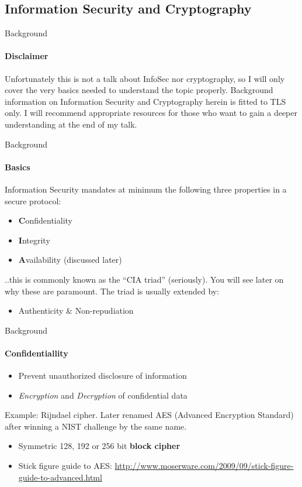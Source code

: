 \documentclass[hyperref={draft}]{beamer}
\begin{document}
\subsection{Information Security and Cryptography}

\begin{frame}{Background}
  \framesubtitle{Disclaimer}
  Unfortunately this is not a talk about InfoSec nor cryptography, so I will only cover the very basics needed to understand the topic properly. Background information on Information Security and Cryptography herein is fitted to TLS only.
  \newline
  \newline
  I will recommend appropriate resources for those who want to gain a deeper understanding at the end of my talk.
\end{frame}

\begin{frame}{Background}
  \framesubtitle{Basics}
  Information Security mandates at minimum the following three properties in a secure protocol:
  \begin{itemize}
    \item \textbf{C}onfidentiality
    \item \textbf{I}ntegrity
    \item \textbf{A}vailability (discussed later)
  \end{itemize}
  ..this is commonly known as the ``CIA triad'' (seriously). You will see later on why these are paramount. The triad is usually extended by:
  \begin{itemize}
    \item Authenticity \& Non-repudiation
  \end{itemize}
\end{frame}

\begin{frame}{Background}
  \framesubtitle{Confidentiallity}
  \begin{itemize}
    \item Prevent unauthorized disclosure of information
    \item \emph{Encryption} and \emph{Decryption} of confidential data
  \end{itemize}
  Example: Rijndael cipher. Later renamed AES (Advanced Encryption Standard) after winning a NIST challenge by the same name.
  \begin{itemize}
    \item Symmetric 128, 192 or 256 bit \textbf{block cipher} 
    \item Stick figure guide to AES: \url{http://www.moserware.com/2009/09/stick-figure-guide-to-advanced.html}
  \end{itemize}
\end{frame}
\end{document}

